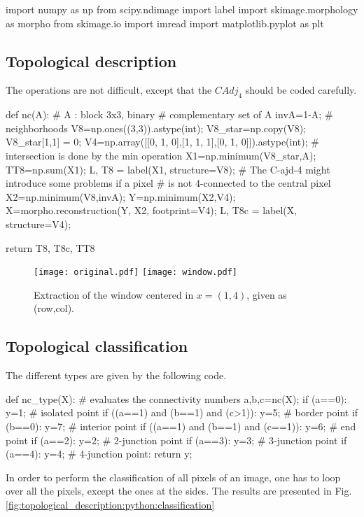 \def\QRCODE{TB_IPR_TUT.IMG.pixel_topological_description_pythonqrcode.png}
\def\QRPAGE{http://www.iptutorials.science/tree/master/TB_IPR/TUT.IMG.pixel_topological_description/python}


\begin{python}
import numpy as np
from scipy.ndimage import label
import skimage.morphology as morpho
from skimage.io import imread
import matplotlib.pyplot as plt
\end{python}

\subsection{Topological description}
The operations are not difficult, except that the $CAdj_4$ should be coded carefully.

\begin{python}
def nc(A):
    # A : block 3x3, binary
    # complementary set of A
    invA=1-A;
    # neighborhoods
    V8=np.ones((3,3)).astype(int);
    V8_star=np.copy(V8);
    V8_star[1,1] = 0;
    V4=np.array([[0, 1, 0],[1, 1, 1],[0, 1, 0]]).astype(int);
    # intersection is done by the min operation
    X1=np.minimum(V8_star,A);
    TT8=np.sum(X1);
    L, T8 = label(X1, structure=V8);
    # The C-ajd-4 might introduce some problems if a pixel
    # is not 4-connected to the central pixel
    X2=np.minimum(V8,invA);
    Y=np.minimum(X2,V4);
    X=morpho.reconstruction(Y, X2, footprint=V4);
    L, T8c = label(X, structure=V4);
    
    return T8, T8c, TT8
\end{python}

\begin{figure}[htbp]
\centering
\texttt{[image: original.pdf]}\hspace{15mm}
\texttt{[image: window.pdf]}
\caption{Extraction of the window centered in $x=(1,4)$, given as (row,col).}
\label{fig:topological_description:python:example}
\end{figure}

\subsection{Topological classification}
The different types are given by the following code.
\begin{python}
def nc_type(X):
    # evaluates the connectivity numbers
    a,b,c=nc(X);
    if (a==0):
        y=1; # isolated point
    if ((a==1) and (b==1) and (c>1)): 
        y=5;  # border point
    if (b==0):
        y=7;  # interior point
    if ((a==1) and (b==1) and (c==1)):
        y=6;  # end point
    if (a==2):
        y=2;  # 2-junction point
    if (a==3):
        y=3;  # 3-junction point
    if (a==4):
        y=4;  # 4-junction point:
    return y; 
\end{python}
In order to perform the classification of all pixels of an image, one has to loop over all the pixels, except the ones at the sides. The results are presented in Fig.\ref{fig:topological_description:python:classification}

